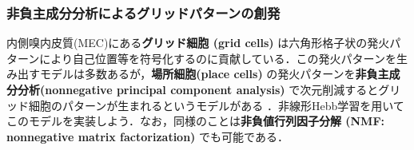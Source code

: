 \subsubsection{非負主成分分析によるグリッドパターンの創発}
内側嗅内皮質(MEC)にある\textbf{グリッド細胞 (grid cells)} は六角形格子状の発火パターンにより自己位置等を符号化するのに貢献している．この発火パターンを生み出すモデルは多数あるが，\textbf{場所細胞(place cells)} の発火パターンを\textbf{非負主成分分析(nonnegative principal component analysis)} で次元削減するとグリッド細胞のパターンが生まれるというモデルがある \citep{Dordek2016-ff}．非線形Hebb学習を用いてこのモデルを実装しよう．なお，同様のことは\textbf{非負値行列因子分解 (NMF: nonnegative matrix factorization)} でも可能である．
